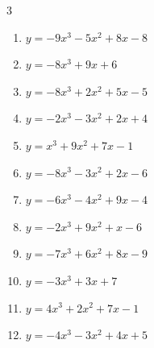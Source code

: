 \begin{multicols}{3}
\begin{enumerate}

  \item $y=-9x^{3}-5x^{2}+8x-8$


  \item $y=-8x^{3}+9x+6$


  \item $y=-8x^{3}+2x^{2}+5x-5$


  \item $y=-2x^{3}-3x^{2}+2x+4$


  \item $y=x^{3}+9x^{2}+7x-1$


  \item $y=-8x^{3}-3x^{2}+2x-6$


  \item $y=-6x^{3}-4x^{2}+9x-4$


  \item $y=-2x^{3}+9x^{2}+x-6$


  \item $y=-7x^{3}+6x^{2}+8x-9$


\columnbreak %

  \item $y=-3x^{3}+3x+7$


  \item $y=4x^{3}+2x^{2}+7x-1$


  \item $y=-4x^{3}-3x^{2}+4x+5$



\end{enumerate}
\end{multicols}
